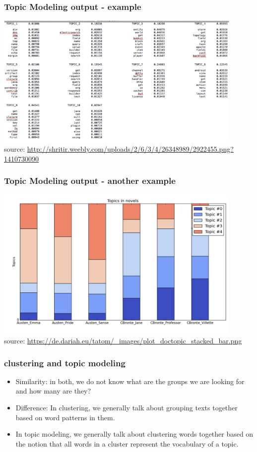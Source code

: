 \documentclass{beamer}
\begin{document}
\begin{frame}
\frametitle{Topic Modeling output - example}
\includegraphics[width=0.9\textwidth]{topicmodeling.png}
\\ \tiny source: \url{http://shritir.weebly.com/uploads/2/6/3/4/26348989/2922455.png?1410730090}
\end{frame}

\begin{frame}
\frametitle{Topic Modeling output - another example}
\includegraphics[width=0.9\textwidth]{topicmodeling2.png}
\\ \tiny source: \url{https://de.dariah.eu/tatom/_images/plot_doctopic_stacked_bar.png}
\end{frame}

\begin{frame}
\frametitle{clustering and topic modeling}
\begin{itemize}
\item Similarity: in both, we do not know what are the groups we are looking for and how many are they?  \pause 
\item Difference: In clustering, we generally talk about grouping texts together based on word patterns in them.\pause
\item In topic modeling, we generally talk about clustering words together based on the notion that all words in a cluster represent the vocabulary of a topic.
\end{itemize}
\end{frame}
\end{document}
